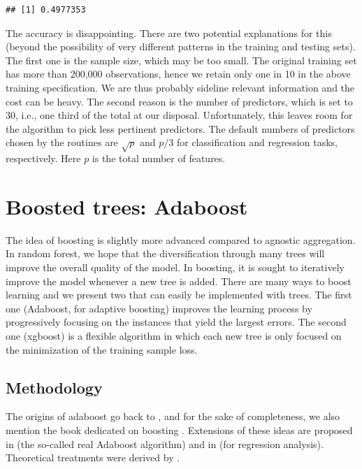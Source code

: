 \documentclass[]{krantz}
\theoremstyle{definition}
\theoremstyle{definition}
\theoremstyle{definition}
\theoremstyle{remark}
\begin{document}
\begin{verbatim}
## [1] 0.4977353
\end{verbatim}

\normalsize

The accuracy is disappointing. There are two potential explanations for
this (beyond the possibility of very different patterns in the training
and testing sets). The first one is the sample size, which may be too
small. The original training set has more than 200,000 observations,
hence we retain only one in 10 in the above training specification. We
are thus probably sideline relevant information and the cost can be
heavy. The second reason is the number of predictors, which is set to
30, i.e., one third of the total at our disposal. Unfortunately, this
leaves room for the algorithm to pick less pertinent predictors. The
default numbers of predictors chosen by the routines are \(\sqrt{p}\)
and \(p/3\) for classification and regression tasks, respectively. Here
\(p\) is the total number of features.

\hypertarget{adaboost}{%
\section{Boosted trees: Adaboost}\label{adaboost}}

The idea of boosting is slightly more advanced compared to agnostic
aggregation. In random forest, we hope that the diversification through
many trees will improve the overall quality of the model. In boosting,
it is sought to iteratively improve the model whenever a new tree is
added. There are many ways to boost learning and we present two that can
easily be implemented with trees. The first one (Adaboost, for adaptive
boosting) improves the learning process by progressively focusing on the
instances that yield the largest errors. The second one (xgboost) is a
flexible algorithm in which each new tree is only focused on the
minimization of the training sample loss.

\hypertarget{methodology}{%
\subsection{Methodology}\label{methodology}}

The origins of adaboost go back to \citet{freund1997decision},
\citet{freund1996experiments} and for the sake of completeness, we also
mention the book dedicated on boosting \citet{schapire2012boosting}.
Extensions of these ideas are proposed in \citet{friedman2000additive}
(the so-called real Adaboost algorithm) and in
\citet{drucker1997improving} (for regression analysis). Theoretical
treatments were derived by \citet{breiman2004population}.
\end{document}
